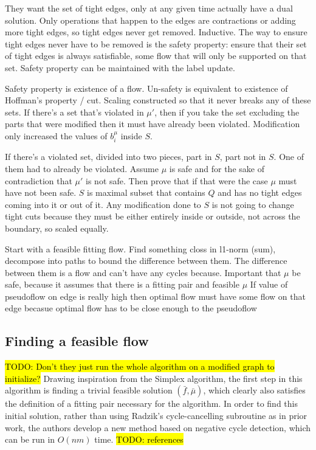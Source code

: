 \documentclass[11pt]{article}
\theoremstyle{definition}
\theoremstyle{definition}
\newcommand{\biu}{b_{i}^{\mu}}
\newcommand{\todo}[1]{\hl{TODO: #1}}
\begin{document}
	They want the set of tight edges, only at any given time actually have a dual solution. Only operations that happen to the edges are contractions or adding more tight edges, so tight edges never get removed. Inductive. The way to ensure tight edges never have to be removed is the safety property: ensure that their set of tight edges is always satisfiable, some flow that will only be supported on that set. Safety property can be maintained with the label update. 
	
	Safety property is existence of a flow. Un-safety is equivalent to existence of Hoffman's property / cut. Scaling constructed so that it never breaks any of these sets. If there's a set that's violated in $\mu'$, then if you take the set excluding the parts that were modified then it must have already been violated. Modification only increased the values of $\biu$ inside $S$.
	
	If there's a violated set, divided into two pieces, part in $S$, part not in $S$. One of them had to already be violated. Assume $\mu$ is safe and for the sake of contradiction that $\mu'$ is not safe. Then prove that if that were the case $\mu$ must have not been safe. 
	$S$ is maximal subset that contains $Q$ and has no tight edges coming into it or out of it. Any modification done to $S$ is not going to change tight cuts because they must be either entirely inside or outside, not across the boundary, so scaled equally. 
	
	Start with a feasible fitting flow. Find something closs in l1-norm (sum), decompose into paths to bound the difference between them. The difference between them is a flow and can't have any cycles because.
	Important that $\mu$ be safe, because it assumes that there is a fitting pair and feasible $\mu$
	If value of pseudoflow on edge is really high then optimal flow must have some flow on that edge becasue optimal flow has to be close enough to the pseudoflow
	

    \subsection{Finding a feasible flow}
	\todo{Don't they just run the whole algorithm on a modified graph to initialize?}
	Drawing inspiration from the Simplex algorithm, the first step in this algorithm is finding a trivial feasible solution $(\bar{f}, \bar{\mu})$, which clearly also satisfies the definition of a fitting pair necessary for the algorithm. In order to find this initial solution, rather than using Radzik's cycle-cancelling subroutine as in prior work, the authors develop a new method based on negative cycle detection, which can be run in $O(nm)$ time. \todo{references} 
    
\end{document}
